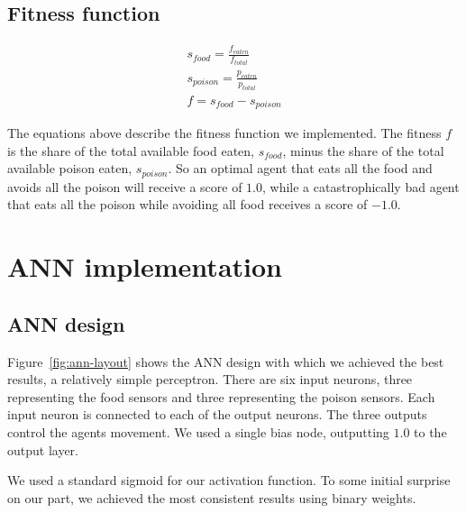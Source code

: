 \documentclass[twoside]{article}
\begin{document}
\begin{multicols}{2}
  \subsection{Fitness function}

  \begin{gather*}
    s_{food} = \frac{f_{eaten}}{f_{total}} \\[10pt]
    s_{poison} = \frac{p_{eaten}}{p_{total}} \\[10pt]
    f = s_{food} - s_{poison}
  \end{gather*}

  The equations above describe the fitness function we implemented.
  The fitness $f$ is the share of the total available food eaten, $s_{food}$, minus the share of the total available poison eaten, $s_{poison}$.
  So an optimal agent that eats all the food and avoids all the poison will receive a score of $1.0$, while a catastrophically bad agent that eats all the poison while avoiding all food receives a score of $-1.0$.

  \section{ANN implementation}

  \subsection{ANN design}

  \def\layersep{2.0cm}

  Figure~\ref{fig:ann-layout} shows the ANN design with which we achieved the best results,
  a relatively simple perceptron.
  There are six input neurons, three representing the food sensors and three representing the poison sensors.
  Each input neuron is connected to each of the output neurons.
  The three outputs control the agents movement.
  We used a single bias node, outputting $1.0$ to the output layer.

  We used a standard sigmoid for our activation function.
  To some initial surprise on our part, we achieved the most consistent results using binary weights.
  
  \begin{figure}[H]
    \centering
\end{figure}
\end{multicols}
\end{document}

